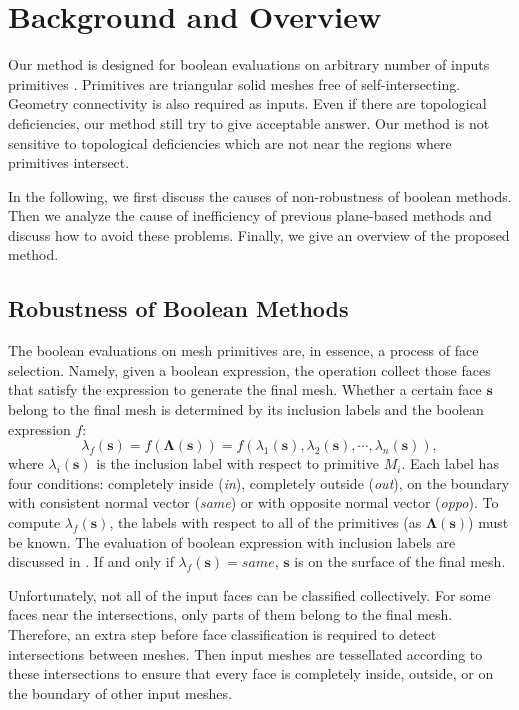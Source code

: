 
\section{Background and Overview}

\label{sec:overview}

Our method is designed for boolean evaluations on arbitrary number of inputs primitives \cite{requicha1985boolean}. Primitives are triangular solid meshes free of self-intersecting. Geometry connectivity is also required as inputs. Even if there are topological deficiencies, our method still try to give acceptable answer. Our method is not sensitive to topological deficiencies which are not near the regions where primitives intersect.

In the following, we first discuss the causes of non-robustness of boolean methods. Then we analyze the cause of inefficiency of previous plane-based methods and discuss how to avoid these problems. Finally, we give an overview of the proposed method.


\subsection{Robustness of Boolean Methods}
\label{sec:paradigm}

The boolean evaluations on mesh primitives are, in essence, a process of face selection. Namely, given a boolean expression, the operation collect those faces that satisfy the expression to generate the final mesh. Whether a certain face $\bm{s}$ belong to the final mesh is determined by its inclusion labels and the boolean expression $f$:
\begin{equation}
\lambda_f(\bm{s}) = f(\boldsymbol{\Lambda}(\bm{s})) = f(\lambda_1(\bm{s}), \lambda_2(\bm{s}), \cdots, \lambda_n(\bm{s})),
\end{equation}
where $\lambda_i(\bm{s})$ is the inclusion label with respect to primitive $M_i$. Each label has four conditions: completely inside (\emph{in}), completely outside (\emph{out}), on the boundary with consistent normal vector (\emph{same}) or with opposite normal vector (\emph{oppo}). To compute $\lambda_f(\bm{s})$, the labels with respect to all of the primitives (as $\boldsymbol{\Lambda}(\bm{s})$) must be known.
The evaluation of boolean expression with inclusion labels are discussed in \cite{douze2015quickcsg,feito2013fast}. If and only if $\lambda_f(\bm{s})=same$, $\bm{s}$ is on the surface of the final mesh.

Unfortunately, not all of the input faces can be classified collectively. For some faces near the intersections, only parts of them belong to the final mesh. Therefore, an extra step before face classification is required to detect intersections between meshes. Then input meshes are tessellated according to these intersections to ensure that every face is completely inside, outside, or on the boundary of other input meshes.

